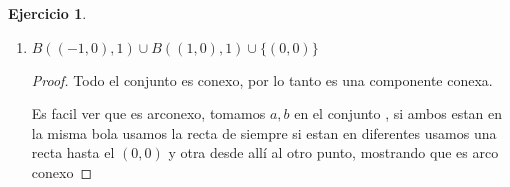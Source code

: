 \documentclass[11pt]{report}
\theoremstyle{definition}
\newtheorem{ej}{Ejercicio}
\begin{document}
\begin{ej}
\begin{enumerate}
\begin{proof}
				Entonces tenemos un conexo que tiene todo $B( (-1,0),1)$ mas algún punto de $B((1,0),1)$ 

				Como $B( (1,0),1)$ es conexo y también tiene ese punto sucede que la unión de ambas bolas tiene que ser conexa, por que es una unión de conexo que comparten un punto, lo que es absurdo.

				Otra forma mas directa era agregar algún punto y ver que el conjunto resultante no es conexo, por lo tanto seguro no es componente conexa
			\end{proof}
		\item $B( (-1,0),1) \cup B( (1,0),1) \cup \{(0,0)\}$
			\begin{proof}
				Todo el conjunto es conexo, por lo tanto es una componente conexa.
				
				Es facil ver que es arconexo, tomamos $a,b$ en el conjunto , si ambos estan en la misma bola usamos la recta de siempre si estan en diferentes usamos una recta hasta el $(0,0)$ y otra desde allí al otro punto, mostrando que es arco conexo
			\end{proof}

	\end{enumerate}
\end{ej}
\end{document}
